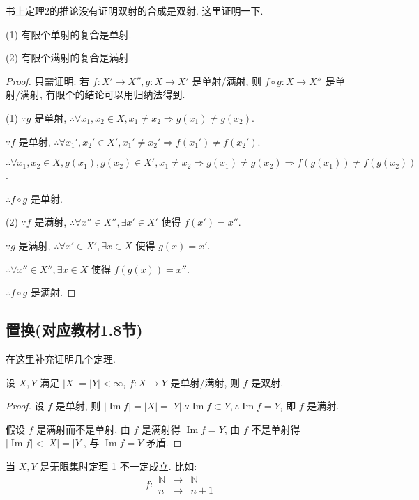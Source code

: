 \documentclass{ctexart}
\begin{document}
书上定理2的推论没有证明双射的合成是双射. 这里证明一下.
\begin{theorem}
    (1) 有限个单射的复合是单射.
    
    (2) 有限个满射的复合是满射.
\end{theorem}
\begin{proof}
    只需证明: 若 $f:X'\to X'',g:X\to X'$ 是单射/满射, 则 $f\circ g:X\to X''$ 是单射/满射, 有限个的结论可以用归纳法得到.

    (1) $\because g$ 是单射, $\therefore\forall x_1,x_2\in X,x_1\neq x_2\Rightarrow g(x_1)\neq g(x_2)$.
    
    $\because f$ 是单射, $\therefore\forall x_1',x_2'\in X',x_1'\neq x_2'\Rightarrow f(x_1')\neq f(x_2')$.

    $\therefore\forall x_1,x_2\in X,g(x_1),g(x_2)\in X',x_1\neq x_2\Rightarrow g(x_1)\neq g(x_2)\Rightarrow f(g(x_1))\neq f(g(x_2))$.

    $\therefore f\circ g$ 是单射.

    (2) $\because f$ 是满射, $\therefore\forall x''\in X'',\exists x'\in X'$ 使得 $f(x')=x''$.

    $\because g$ 是满射, $\therefore\forall x'\in X',\exists x\in X$ 使得 $g(x)=x'$.

    $\therefore\forall x''\in X'',\exists x\in X$ 使得 $f(g(x))=x''$.

    $\therefore f\circ g$ 是满射.
\end{proof}
\subsection{置换(对应教材1.8节)}
在这里补充证明几个定理.
\begin{theorem}
    设 $X,Y$ 满足 $|X|=|Y|<\infty$, $f:X\to Y$ 是单射/满射, 则 $f$ 是双射.
\end{theorem}
\begin{proof}
    设 $f$ 是单射, 则 $|\operatorname{Im}f|=|X|=|Y|.\because\operatorname{Im}f\subset Y,\therefore\operatorname{Im}f=Y$, 即 $f$ 是满射.

    假设 $f$ 是满射而不是单射, 由 $f$ 是满射得 $\operatorname{Im}f=Y$, 由 $f$ 不是单射得 $|\operatorname{Im}f|<|X|=|Y|$, 与 $\operatorname{Im}f=Y$ 矛盾.
\end{proof}

当 $X,Y$ 是无限集时定理 1 不一定成立. 比如:
\[f:\begin{array}{rcl}
\mathbb{N} & \to & \mathbb{N} \\
n & \to & n+1
\end{array}\]
\end{document}
